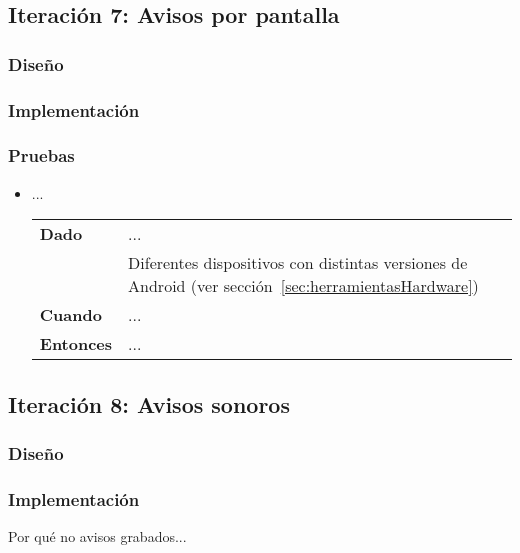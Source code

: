 \subsection{Iteración 7: Avisos por pantalla}
\subsubsection{Diseño}
\subsubsection{Implementación}
\begin{listing}[
  float=ht,
  language = java,
  caption  = {},
  label    = code:]

\end{listing}
\subsubsection{Pruebas}
\begin{itemize}
  \item ...

  \begin{tabular}{p{}p{}}
    \hline
    \textbf{Dado}     & ... \\
                      & Diferentes dispositivos con distintas versiones de Android (ver
                        sección~\ref{sec:herramientasHardware}) \\
    \textbf{Cuando}   & ... \\
    \textbf{Entonces} & ... \\
    \hline
  \end{tabular}
\end{itemize}

\subsection{Iteración 8: Avisos sonoros}
\subsubsection{Diseño}
\subsubsection{Implementación}
Por qué no avisos grabados...
\begin{listing}[
  float=ht,
  language = java,
  caption  = {},
  label    = code:]

\end{listing}

